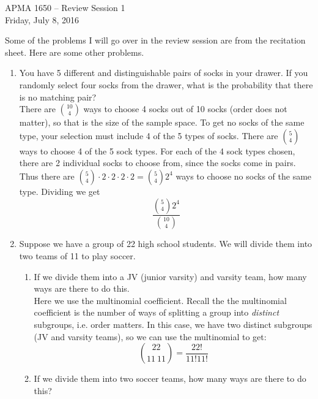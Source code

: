 \documentclass[12pt]{article}
\begin{document}
\title{}
\author{\vspace{-10ex} }

\begin{center}
{\LARGE APMA 1650 -- Review Session 1}\\
\vspace{5mm}
{\large Friday, July 8, 2016}\\
\end{center}

Some of the problems I will go over in the review session are from the recitation sheet. Here are some other problems.

\begin{enumerate}

\item You have 5 different and distinguishable pairs of socks in your drawer. If you randomly select four socks from the drawer, what is the probability that there is no matching pair?\\

There are $\binom{10}{4}$ ways to choose 4 socks out of 10 socks (order does not matter), so that is the size of the sample space. To get no socks of the same type, your selection must include 4 of the 5 types of socks. There are $\binom{5}{4}$ ways to choose 4 of the 5 sock types. For each of the 4 sock types chosen, there are 2 individual socks to choose from, since the socks come in pairs. Thus there are $\binom{5}{4}\cdot2\cdot2\cdot2\cdot2 = \binom{5}{4}2^4$ ways to choose no socks of the same type. Dividing we get
\[
\frac{\binom{5}{4}2^4}{\binom{10}{4}}
\]

\item Suppose we have a group of 22 high school students. We will divide them into two teams of 11 to play soccer.
\begin{enumerate}
\item If we divide them into a JV (junior varsity) and varsity team, how many ways are there to do this.\\

Here we use the multinomial coefficient. Recall the the multinomial coefficient is the number of ways of splitting a group into \emph{distinct} subgroups, i.e. order matters. In this case, we have two distinct subgroups (JV and varsity teams), so we can use the multinomial to get:
\[
\binom{22}{11 \: 11} = \frac{22!}{11! 11!}
\]
\item If we divide them into two soccer teams, how many ways are there to do this?\\


\end{enumerate}
\end{enumerate}
\end{document}
